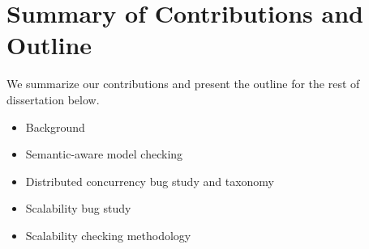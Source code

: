 \section{Summary of Contributions and Outline}

We summarize our contributions and present the outline for the rest of
dissertation below.

\begin{itemize}

\item Background

\item Semantic-aware model checking

\item Distributed concurrency bug study and taxonomy

\item Scalability bug study

\item Scalability checking methodology

\end{itemize}
